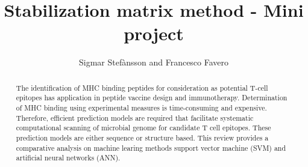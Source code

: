 \documentclass{bioinfo}
\begin{document}
\begin{application}

\title[SMM Project]{Stabilization matrix method - Mini project}
\author[Sigmar Stef\`{a}nsson, Francesco Favero]{Sigmar Stef\`{a}nsson and Francesco Favero}

\address{Danmarks Tekniske Univeristet}



\maketitle

\begin{abstract}

   
The identification of MHC binding peptides for consideration as potential T-cell epitopes has application in peptide vaccine design and immunotherapy. 
Determination of MHC binding using experimental measures is time-consuming and expensive. 
Therefore, efficient prediction models are required that facilitate systematic computational scanning of microbial genome for candidate T cell epitopes. 
These prediction models are either sequence or structure based. 
This review provides a comparative analysis on machine learing methods support vector machine (SVM) and artificial neural networks (ANN).

\end{abstract}


\end{application}
\end{document}
